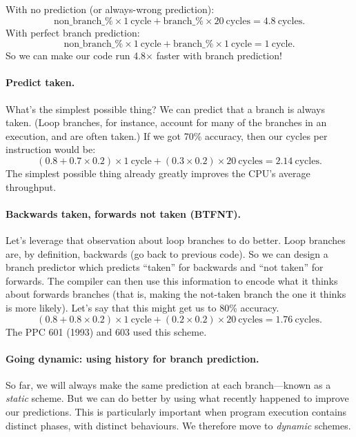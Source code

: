 \documentclass[a4paper]{report}
\begin{document}
With no prediction (or always-wrong prediction):
\[
\mathrm{non\_branch\_\%} \times 1 \mathrm{~cycle} + \mathrm{branch\_\%} \times 20 \mathrm{~cycles} = 4.8 \mathrm{~cycles}.
\]
With perfect branch prediction:
\[
\mathrm{non\_branch\_\%} \times 1 \mathrm{~cycle} + \mathrm{branch\_\%} \times 1 \mathrm{~cycle} = 1 \mathrm{~cycle}.
\]
So we can make our code run 4.8$\times$ faster with branch prediction!

\paragraph{Predict taken.} What's the simplest possible thing? We can
predict that a branch is always taken. (Loop branches, for instance,
account for many of the branches in an execution, and are often taken.)
If we got 70\% accuracy, then our cycles per instruction would be:
\[
(0.8 + 0.7 \times 0.2) \times 1 \mathrm{~cycle} + (0.3 \times 0.2) \times 20 \mathrm{~cycles} = 2.14 \mathrm{~cycles}.
\]
The simplest possible thing already greatly improves the CPU's average throughput.

\paragraph{Backwards taken, forwards not taken (BTFNT).}
Let's leverage that observation about loop branches to do better.
Loop branches are, by definition, backwards (go back to previous
code). So we can design a branch predictor which predicts ``taken''
for backwards and ``not taken'' for forwards. The compiler can then
use this information to encode what it thinks about forwards branches
(that is, making the not-taken branch the one it thinks is more likely).
Let's say that this might get us to 80\% accuracy. \[
(0.8 + 0.8 \times 0.2) \times 1 \mathrm{~cycle} + (0.2 \times 0.2) \times 20 \mathrm{~cycles} = 1.76 \mathrm{~cycles}.
\]
The PPC 601 (1993) and 603 used this scheme.

\paragraph{Going dynamic: using history for branch prediction.}
So far, we will always make the same prediction at each branch---known as a
\emph{static} scheme. But we can do better by using what recently happened to
improve our predictions. This is particularly important when program execution
contains distinct phases, with distinct behaviours.
We therefore move to \emph{dynamic} schemes.
\end{document}
